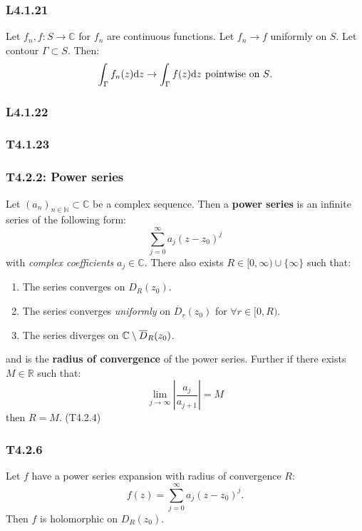 \documentclass{article}
\begin{document}
\begin{multicols*}{3}
\subsubsection*{L4.1.21}
Let $f_n,f:S\rightarrow\mathbb{C}$ for $f_n$ are continuous
functions. Let $f_n\rightarrow f$ uniformly on $S$. 
Let contour $\Gamma\subset S$. Then:
$$\int_{\Gamma}f_n(z)\dd z\rightarrow\int_{\Gamma}f(z)\dd z
\hspace{0.05in}\text{pointwise on $S$.}$$

\subsubsection*{L4.1.22}

\subsubsection*{T4.1.23}

\subsubsection*{T4.2.2: Power series}
Let $(a_n)_{n\in\mathbb{N}}\subset\mathbb{C}$ be a complex sequence.
Then a \textbf{power series} is an infinite series of 
the following form:
$$\sum_{j=0}^{\infty}a_j (z-z_0)^j$$
with \textit{complex coefficients} $a_j\in\mathbb{C}$.
There also exists $R\in[0,\infty)\cup\{\infty\}$ such that:
\begin{enumerate}
    \item The series converges on $D_R(z_0)$.
    
    \item The series converges \textit{uniformly} on
    $\overline{D}_r(z_0)$ for $\forall r\in[0,R)$.

    \item The series diverges on $\mathbb{C}\hspace{0.03in}\backslash
    \hspace{0.03in}\overline{D}_R(z_0)$.
\end{enumerate}
and is the \textbf{radius of convergence} of the power series.
Further if there exists $M\in\mathbb{R}$ such that:
$$\lim_{j\rightarrow\infty}\left|\frac{a_j}{a_{j+1}}\right|=M$$
then $R=M$. (T4.2.4)

\subsubsection*{T4.2.6}
Let $f$ have a power series expansion with radius of convergence $R$:
$$f(z)=\sum_{j=0}^{\infty}a_j (z-z_0)^j.$$
Then $f$ is holomorphic on $D_R(z_0)$.


\end{multicols*}
\end{document}
